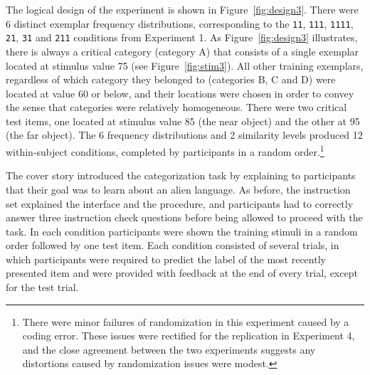 \documentclass[doc]{apa6}
\newcommand{\dist}[1]{\texttt{#1}}
\begin{document}
The logical design of the experiment is shown in Figure~\ref{fig:design3}. There were 6 distinct exemplar frequency distributions, corresponding to the \dist{11}, \dist{111}, \dist{1111}, \dist{21}, \dist{31} and \dist{211} conditions from Experiment 1. As Figure~\ref{fig:design3} illustrates, there is always a critical category (category A) that consists of a single exemplar located at stimulus value 75 (see Figure~\ref{fig:stim3}). All other training exemplars, regardless of which category they belonged to (categories B, C and D) were located at value 60 or below, and their locations were chosen in order to convey the sense that categories were relatively homogeneous. There were two critical test items, one located at stimulus value 85 (the near object) and the other at 95 (the far object). The 6 frequency distributions and 2 similarity levels produced 12 within-subject conditions, completed by participants in a random order.\footnote{There were minor failures of randomization in this experiment caused by a coding error. These issues were rectified for the replication in Experiment 4, and the close agreement between the two experiments suggests any distortions caused by randomization issues were modest.}

The cover story introduced the categorization task by explaining to participants that their goal was to learn about an alien language. As before, the instruction set explained the interface and the procedure, and participants had to correctly answer three instruction check questions before being allowed to proceed with the task. In each condition participants were shown the training stimuli in a random order followed by one test item. Each condition consisted of several trials, in which participants were required to predict the label of the most recently presented item and were provided with feedback at the end of every trial, except for the test trial.
\end{document}
